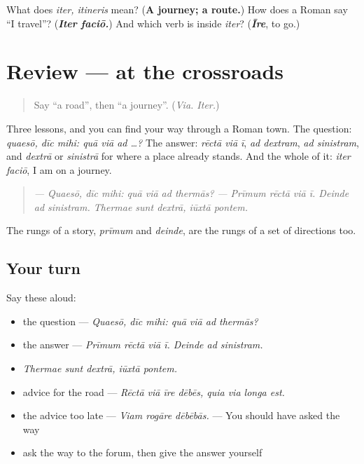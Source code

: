 \begin{tcolorbox}[breakable,colback=teal!4,colframe=teal!35!black,title={Before you move on}]
What does \emph{iter, itineris} mean? (\textbf{A journey; a route.}) How does a Roman say \textquotedblleft{}I travel\textquotedblright{}? (\emph{\textbf{Iter faciō.}}) And which verb is inside \emph{iter}? (\emph{\textbf{Īre}}, to go.)
\end{tcolorbox}
\section[(review)]{Review — at the crossroads}

\label{lesson:LA-R285-asking-the-way}



\begin{quote}
Say \textquotedblleft{}a road\textquotedblright{}, then \textquotedblleft{}a journey\textquotedblright{}. (\emph{Via. Iter.})
\end{quote}

\begin{grammarlens}[title={What you've built}]
Three lessons, and you can find your way through a Roman town. The question: \emph{quaesō, dīc mihi: quā viā ad …?} The answer: \emph{rēctā viā ī}, \emph{ad dextram}, \emph{ad sinistram}, and \emph{dextrā} or \emph{sinistrā} for where a place already stands. And the whole of it: \emph{iter faciō}, I am on a journey.

\begin{quote}
\emph{— Quaesō, dīc mihi: quā viā ad thermās?} \emph{— Prīmum rēctā viā ī. Deinde ad sinistram. Thermae sunt dextrā, iūxtā pontem.}
\end{quote}

The rungs of a story, \emph{prīmum} and \emph{deinde}, are the rungs of a set of directions too.
\end{grammarlens}

\subsection*{Your turn}
Say these aloud:

\begin{itemize}
\raggedright
  \item the question — \emph{Quaesō, dīc mihi: quā viā ad thermās?}
  \item the answer — \emph{Prīmum rēctā viā ī. Deinde ad sinistram.}
  \item \emph{Thermae sunt dextrā, iūxtā pontem.}
  \item advice for the road — \emph{Rēctā viā īre dēbēs, quia via longa est.}
  \item the advice too late — \emph{Viam rogāre dēbēbās.} — You should have asked the way
  \item ask the way to the forum, then give the answer yourself
\end{itemize}

